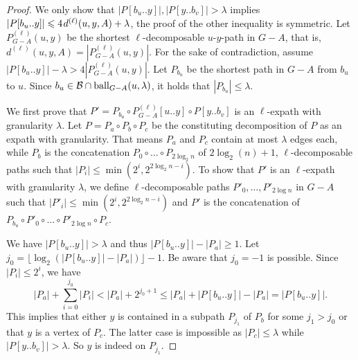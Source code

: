 \documentclass{theoretics}
\newcommand*{\B}{\mathcal{B}}
\newcommand*{\length}[1]{|#1|}
\newcommand*{\ball}{\mbox{\rm ball}}
\newcommand*{\nwspace}{\hspace*{.1em}}
\renewcommand{\leq}{\leqslant}
\renewcommand{\le}{\leqslant}
\renewcommand{\ge}{\geqslant}
\begin{document}
\begin{proof}
We only show that $|P[b_u..y]|, \length{P[y..b_v]} > \lambda$ implies 
$\length{P[b_u..y]} \le 4 \nwspace d^{(\ell)}(u,y,A) + \lambda$,
the proof of the other inequality is symmetric.
Let $P^{(\ell)}_{G-A}(u,y)$ be the shortest $\ell$-decomposable $u$-$y$-path
in $G-A$, that is, $d^{(\ell)}(u,y,A) = \length{P^{(\ell)}_{G-A}(u,y)}$.
For the sake of contradiction, assume $\length{P[b_u..y]}-\lambda > 4\length{P^{(\ell)}_{G-A}(u,y)}$.
Let $P_{b_u}$ be the shortest path in $G-A$ from $b_u$ to $u$.
Since $b_u \in \B \cap \ball_{G-A}(u,\lambda)$, it holds that $\length{P_{b_u}} \leq \lambda$.

We first prove that $P'=P_{b_u} \circ P^{(\ell)}_{G-A}[u..y]\circ P[y..b_v]$ is an $\ell$-expath with granularity $\lambda$.
Let $P=P_a \circ P_b \circ P_c$ be the constituting decomposition of $P$ as an expath with granularity.
That means $P_a$ and $P_c$ contain at most $\lambda$ edges each, while $P_b$ is the concatenation $P_0\circ \ldots \circ P_{2\log_2 n}$ of $2\log_2(n)+1$, $\ell$-decomposable paths 
such that $\length{P_i} \leq \min(2^i,2^{2\log_2 n - i})$.
To show that $P'$ is an $\ell$-expath with granularity $\lambda$, we define $\ell$-decomposable paths $P'_0,\ldots, P'_{2\log n}$ in $G-A$ such that $\length{P'_i} \leq \min(2^i,2^{2\log_2 n - i})$ and $P'$ is the concatenation of $P_{b_u} \circ P'_0 \circ \ldots \circ P'_{2\log n} \circ P_c$.

We have $\length{P[b_u..y]} > \lambda$ and thus $\length{P[b_u..y]}-\length{P_a} \ge 1$.
Let $j_0= \lfloor \log_2(\length{P[b_u..y]}-\length{P_a})\rfloor -1$.
Be aware that $j_0  = -1$ is possible.
Since $\length{P_i} \leq 2^i$, we have
\begin{equation*}
	\length{P_a} + \sum_{i=0}^{j_0} \length{P_i} < \length{P_a} + 2^{j_0+1} \le
	\length{P_a} + \length{P[b_u..y]}-\length{P_a}
	= \length{P[b_u..y]}.
\end{equation*}
This implies that either $y$ is contained in a subpath $P_{j_1}$ of $P_b$ for some $j_1 > j_0$ 
or that $y$ is a vertex of $P_c$. 
The latter case is impossible 
as $\length{P_c} \leq \lambda$ while $\length{P[y..b_v]} > \lambda$. 
So $y$ is indeed on $P_{j_1}$.


\end{proof}
\end{document}
